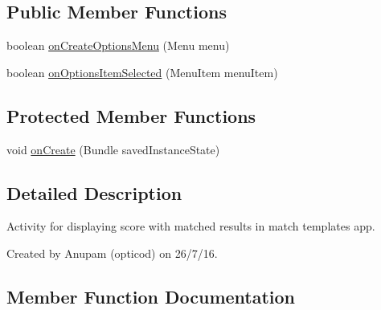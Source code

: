 \subsection*{Public Member Functions}
\begin{DoxyCompactItemize}
\item 
boolean \hyperlink{classorg_1_1buildmlearn_1_1matchtemplate_1_1activities_1_1DetailActivity_a6bc6da87c22d55a168871683441ce4a2}{on\+Create\+Options\+Menu} (Menu menu)
\item 
boolean \hyperlink{classorg_1_1buildmlearn_1_1matchtemplate_1_1activities_1_1DetailActivity_a1c08f687a0d56ac8e85d3da66ac3570e}{on\+Options\+Item\+Selected} (Menu\+Item menu\+Item)
\end{DoxyCompactItemize}
\subsection*{Protected Member Functions}
\begin{DoxyCompactItemize}
\item 
void \hyperlink{classorg_1_1buildmlearn_1_1matchtemplate_1_1activities_1_1DetailActivity_ab67753894ab5f131aa2a45c7d7720ba1}{on\+Create} (Bundle saved\+Instance\+State)
\end{DoxyCompactItemize}


\subsection{Detailed Description}
Activity for displaying score with matched results in match template\textquotesingle{}s app. 

Created by Anupam (opticod) on 26/7/16. 

\subsection{Member Function Documentation}

